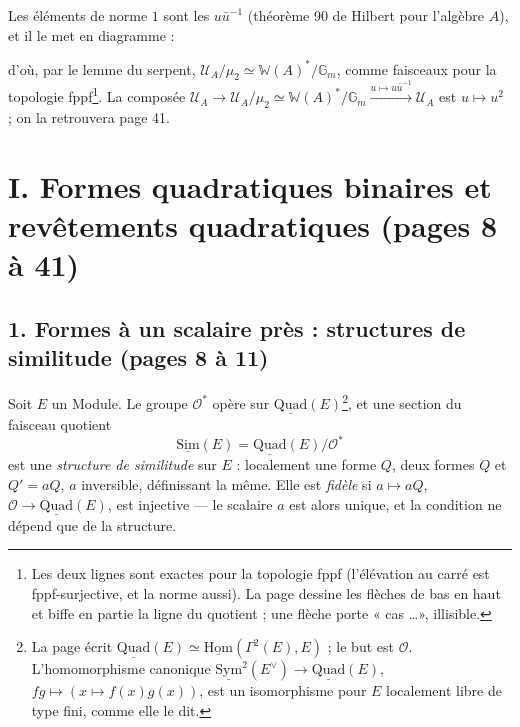 \documentclass[11pt,a4paper]{article}
\begin{document}
Les éléments de norme $1$ sont les $u\bar{u}^{-1}$ (théorème 90 de Hilbert pour
l'algèbre $A$), et il le met en diagramme :


d'où, par le lemme du serpent, $\mathcal{U}_A/\mu_2 \simeq \mathbb{W}(A)^{*}/\mathbb{G}_m$,
comme faisceaux pour la topologie fppf\footnote{Les deux lignes sont exactes pour
la topologie fppf (l'élévation au carré est fppf-surjective, et la norme aussi).
La page dessine les flèches de bas en haut et biffe en partie la ligne du
quotient ; une flèche porte « cas \ldots », illisible.}. La composée
$\mathcal{U}_A \to \mathcal{U}_A/\mu_2 \simeq \mathbb{W}(A)^{*}/\mathbb{G}_m \xrightarrow{u \mapsto
u\bar{u}^{-1}} \mathcal{U}_A$ est $u \mapsto u^{2}$ ; on la retrouvera page 41.

\section*{I. Formes quadratiques binaires et revêtements quadratiques (pages 8 à 41)}

\subsection*{1. Formes à un scalaire près : structures de similitude (pages 8 à 11)}

Soit $E$ un Module. Le groupe $\mathcal{O}^{*}$ opère sur
$\underline{\mathrm{Quad}}(E)$\footnote{La page écrit
$\underline{\mathrm{Quad}}(E) \simeq \underline{\mathrm{Hom}}(\Gamma^{2}(E), E)$ ; le but est
$\mathcal{O}$. L'homomorphisme canonique $\underline{\mathrm{Sym}}^{2}(E^{\vee}) \to
\underline{\mathrm{Quad}}(E)$, $fg \mapsto (x \mapsto f(x)g(x))$, est un isomorphisme
pour $E$ localement libre de type fini, comme elle le dit.}, et une section du
faisceau quotient
\[
  \underline{\mathrm{Sim}}(E) = \underline{\mathrm{Quad}}(E)/\mathcal{O}^{*}
\]
est une \emph{structure de similitude} sur $E$ : localement une forme $Q$, deux
formes $Q$ et $Q' = aQ$, $a$ inversible, définissant la même. Elle est
\emph{fidèle} si $a \mapsto aQ$, $\mathcal{O} \to \underline{\mathrm{Quad}}(E)$, est
injective --- le scalaire $a$ est alors unique, et la condition ne dépend que
de la structure.
\end{document}
